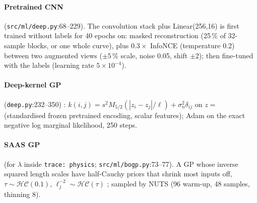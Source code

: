 \documentclass[10pt,a4paper]{article}
\newcommand{\code}[1]{\texttt{\small #1}}
\begin{document}
\paragraph{Pretrained CNN} (\code{src/ml/deep.py}:68--229). The convolution stack plus Linear(256,16) is first trained without labels
for 40 epochs on: masked reconstruction (25\,\% of 32-sample blocks, or one whole curve), plus $0.3\times$ InfoNCE
\cite{oord2018} (temperature 0.2) between two augmented views ($\pm5$\,\% scale, noise 0.05, shift $\pm2$); then fine-tuned with
the labels (learning rate $5\times10^{-4}$).

\paragraph{Deep-kernel GP} (\code{deep.py}:232--350) \cite{wilson2016}: $k(i,j)=s^2M_{5/2}(|z_i-z_j|/\ell)+\sigma_n^2\delta_{ij}$ on
$z=$ (standardised frozen pretrained encoding, scalar features); Adam on the exact negative log marginal likelihood, 250 steps.

\paragraph{SAAS GP} (for $\lambda$ inside \code{trace: physics}; \code{src/ml/bogp.py}:73--77). A GP whose inverse squared length
scales have half-Cauchy priors that shrink most inputs off, $\tau\sim\mathcal{HC}(0.1)$, $\ell_j^{-2}\sim\mathcal{HC}(\tau)$
\cite{eriksson2021}; sampled by NUTS \cite{hoffman2014} (96 warm-up, 48 samples, thinning 8).
\end{document}
